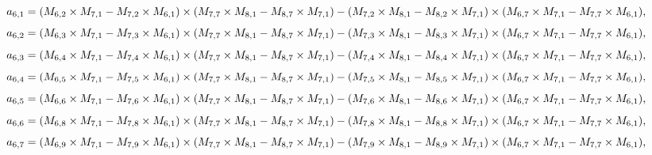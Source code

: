 \documentclass[10pt]{asme2ej}
\begin{document}
\begin{landscape}
\begin{equation}
\end{equation}
\begin{equation}
    a_{6,1} = (M_{6,2}\times M_{7,1}-M_{7,2}\times M_{6,1})\times (M_{7,7}\times M_{8,1}-M_{8,7}\times M_{7,1})\\-(M_{7,2}\times M_{8,1}-M_{8,2}\times M_{7,1})\times (M_{6,7}\times M_{7,1}-M_{7,7}\times M_{6,1}),
\end{equation}
\begin{equation}
    a_{6,2} = (M_{6,3}\times M_{7,1}-M_{7,3}\times M_{6,1})\times (M_{7,7}\times M_{8,1}-M_{8,7}\times M_{7,1})\\-(M_{7,3}\times M_{8,1}-M_{8,3}\times M_{7,1})\times (M_{6,7}\times M_{7,1}-M_{7,7}\times M_{6,1}),
\end{equation}
\begin{equation}
    a_{6,3} = (M_{6,4}\times M_{7,1}-M_{7,4}\times M_{6,1})\times (M_{7,7}\times M_{8,1}-M_{8,7}\times M_{7,1})\\-(M_{7,4}\times M_{8,1}-M_{8,4}\times M_{7,1})\times (M_{6,7}\times M_{7,1}-M_{7,7}\times M_{6,1}),
\end{equation}
\begin{equation}
    a_{6,4} = (M_{6,5}\times M_{7,1}-M_{7,5}\times M_{6,1})\times (M_{7,7}\times M_{8,1}-M_{8,7}\times M_{7,1})\\-(M_{7,5}\times M_{8,1}-M_{8,5}\times M_{7,1})\times (M_{6,7}\times M_{7,1}-M_{7,7}\times M_{6,1}),
\end{equation}
\begin{equation}
    a_{6,5} = (M_{6,6}\times M_{7,1}-M_{7,6}\times M_{6,1})\times (M_{7,7}\times M_{8,1}-M_{8,7}\times M_{7,1})\\-(M_{7,6}\times M_{8,1}-M_{8,6}\times M_{7,1})\times (M_{6,7}\times M_{7,1}-M_{7,7}\times M_{6,1}),
\end{equation}
\begin{equation}
    a_{6,6} = (M_{6,8}\times M_{7,1}-M_{7,8}\times M_{6,1})\times (M_{7,7}\times M_{8,1}-M_{8,7}\times M_{7,1})\\-(M_{7,8}\times M_{8,1}-M_{8,8}\times M_{7,1})\times (M_{6,7}\times M_{7,1}-M_{7,7}\times M_{6,1}),
\end{equation}
\begin{equation}
    a_{6,7} = (M_{6,9}\times M_{7,1}-M_{7,9}\times M_{6,1})\times (M_{7,7}\times M_{8,1}-M_{8,7}\times M_{7,1})\\-(M_{7,9}\times M_{8,1}-M_{8,9}\times M_{7,1})\times (M_{6,7}\times M_{7,1}-M_{7,7}\times M_{6,1}),
\end{equation}

\end{landscape}
\end{document}

